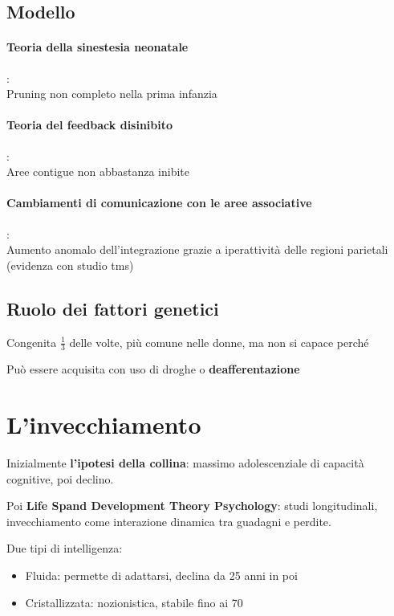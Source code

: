 \documentclass[12pt, a4paper]{article}
\begin{document}
\subsection{Modello} 

\paragraph{Teoria della sinestesia neonatale}:\\  
Pruning non completo nella prima infanzia

\paragraph{Teoria del feedback disinibito}:\\  
Aree contigue non abbastanza inibite

\paragraph{Cambiamenti di comunicazione con le aree associative}:\\
Aumento anomalo dell'integrazione grazie a iperattività delle regioni parietali (evidenza con studio tms)

\subsection{Ruolo dei fattori genetici} 

Congenita $\frac{1}{3}$ delle volte, più comune nelle donne, ma non si capace perché 

Può essere acquisita con uso di droghe o \textbf{deafferentazione} 

\section{L'invecchiamento}

Inizialmente \textbf{l'ipotesi della collina}: massimo adolescenziale di capacità cognitive, poi declino.

Poi \textbf{Life Spand Development Theory Psychology}: studi longitudinali, invecchiamento come interazione dinamica tra guadagni e perdite.

Due tipi di intelligenza:
\begin{itemize}
    \item Fluida: permette di adattarsi, declina da 25 anni in poi
    \item Cristallizzata: nozionistica, stabile fino ai 70
\end{itemize}
\end{document}
